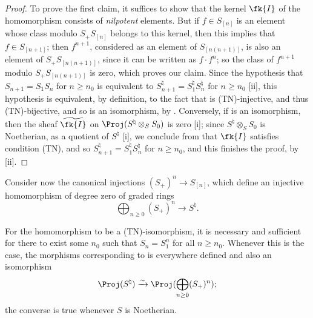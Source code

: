 \begin{proof}
To prove the first claim, it suffices  to show that the kernel $\fk{I}$ of the homomorphism  consists of \emph{nilpotent} elements.
But if $f\in S_{[n]}$ is an element whose class modulo $S_+S_{[n]}$ belongs to this kernel, then this implies that $f\in S_{[n+1]}$;
then $f^{n+1}$, considered as an element of $S_{[n(n+1)]}$, is also an element of $S_+S_{[n(n+1)]}$, since it can be written as $f\cdot f^n$;
so the class of $f^{n+1}$ modulo $S_+S_{[n(n+1)]}$ is zero, which proves our claim.
Since the hypothesis that $S_{n+1}=S_1S_n$ for $n\geq n_0$ is equivalent to $S_{n+1}^\natural=S_1^\natural S_n^\natural$ for $n\geq n_0$ [ii], this hypothesis is equivalent, by definition, to the fact that  is (TN)-injective, and thus (TN)-bijective, and so  is an isomorphism, by .
Conversely, if  is an isomorphism, then the sheaf $\widetilde{\fk{I}}$ on $\Proj(S^\natural\otimes_S S_0)$ is zero [i];
since $S^\natural\otimes_S S_0$ is Noetherian, as a quotient of $S^\natural$ [i], we conclude from  that $\fk{I}$ satisfies condition (TN), and so $S_{n+1}^\natural=S_1^\natural S_n^\natural$ for $n\geq n_0$, and this finishes the proof, by [ii].
\end{proof}

\begin{env}[8.2.13]
\label{II.8.2.13}
Consider now the canonical injections $(S_+)^n\to S_{[n]}$, which define an injective homomorphism of degree zero of graded rings
\[
\label{II.8.2.13.1}
  \bigoplus_{n\geq0} (S_+)^n \to S^\natural.
\tag{8.2.13.1}
\]
\end{env}

\begin{proposition}[8.2.14]
\label{II.8.2.14}
For the homomorphism  to be a (TN)-isomorphism, it is necessary and sufficient for there to exist some $n_0$ such that $S_n=S_1^n$ for all $n\geq n_0$.
Whenever this is the case, the morphisms corresponding to  is everywhere defined and also an isomorphism
\[
  \Proj(S^\natural) \xrightarrow{\sim} \Proj(\bigoplus_{n\geq0}(S_+)^n);
\]
the converse is true whenever $S$ is Noetherian.
\end{proposition}

